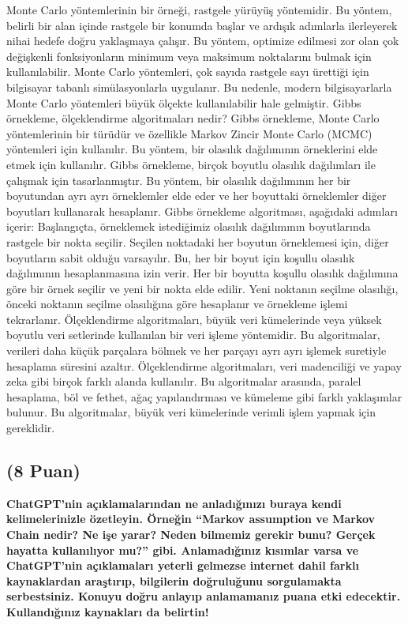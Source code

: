 \documentclass[11pt]{article}
\begin{document}
Monte Carlo yöntemlerinin bir örneği, rastgele yürüyüş yöntemidir. Bu yöntem, belirli bir alan içinde rastgele bir konumda başlar ve ardışık adımlarla ilerleyerek nihai hedefe doğru yaklaşmaya çalışır. Bu yöntem, optimize edilmesi zor olan çok değişkenli fonksiyonların minimum veya maksimum noktalarını bulmak için kullanılabilir.
Monte Carlo yöntemleri, çok sayıda rastgele sayı ürettiği için bilgisayar tabanlı simülasyonlarla uygulanır. Bu nedenle, modern bilgisayarlarla Monte Carlo yöntemleri büyük ölçekte kullanılabilir hale gelmiştir.
Gibbs örnekleme, ölçeklendirme algoritmaları nedir?
Gibbs örnekleme, Monte Carlo yöntemlerinin bir türüdür ve özellikle Markov Zincir Monte Carlo (MCMC) yöntemleri için kullanılır. Bu yöntem, bir olasılık dağılımının örneklerini elde etmek için kullanılır.
Gibbs örnekleme, birçok boyutlu olasılık dağılımları ile çalışmak için tasarlanmıştır. Bu yöntem, bir olasılık dağılımının her bir boyutundan ayrı ayrı örneklemler elde eder ve her boyuttaki örneklemler diğer boyutları kullanarak hesaplanır.
Gibbs örnekleme algoritması, aşağıdaki adımları içerir:
Başlangıçta, örneklemek istediğimiz olasılık dağılımının boyutlarında rastgele bir nokta seçilir.
Seçilen noktadaki her boyutun örneklemesi için, diğer boyutların sabit olduğu varsayılır. Bu, her bir boyut için koşullu olasılık dağılımının hesaplanmasına izin verir.
Her bir boyutta koşullu olasılık dağılımına göre bir örnek seçilir ve yeni bir nokta elde edilir.
Yeni noktanın seçilme olasılığı, önceki noktanın seçilme olasılığına göre hesaplanır ve örnekleme işlemi tekrarlanır.
Ölçeklendirme algoritmaları, büyük veri kümelerinde veya yüksek boyutlu veri setlerinde kullanılan bir veri işleme yöntemidir. Bu algoritmalar, verileri daha küçük parçalara bölmek ve her parçayı ayrı ayrı işlemek suretiyle hesaplama süresini azaltır.
Ölçeklendirme algoritmaları, veri madenciliği ve yapay zeka gibi birçok farklı alanda kullanılır. Bu algoritmalar arasında, paralel hesaplama, böl ve fethet, ağaç yapılandırması ve kümeleme gibi farklı yaklaşımlar bulunur. Bu algoritmalar, büyük veri kümelerinde verimli işlem yapmak için gereklidir.


\subsection{(8 Puan)} \textbf{ChatGPT’nin açıklamalarından ne anladığınızı buraya kendi kelimelerinizle özetleyin. Örneğin ``Markov assumption ve Markov Chain nedir? Ne işe yarar? Neden bilmemiz gerekir bunu? Gerçek hayatta kullanılıyor mu?'' gibi. Anlamadığınız kısımlar varsa ve ChatGPT’nin açıklamaları yeterli gelmezse internet dahil farklı kaynaklardan araştırıp, bilgilerin doğruluğunu sorgulamakta serbestsiniz. Konuyu doğru anlayıp anlamamanız puana etki edecektir. Kullandığınız kaynakları da belirtin!}
\end{document}

